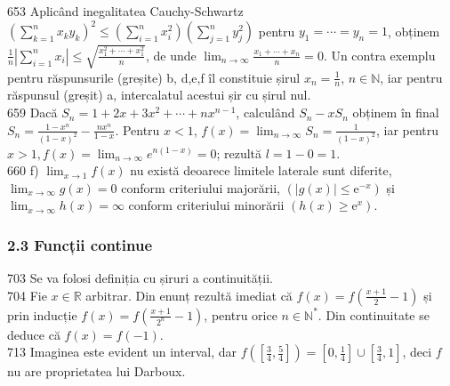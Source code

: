 \documentclass[11pt]{article}
\begin{document}
653 Aplicând inegalitatea Cauchy-Schwartz $\left(\sum_{k=1}^{n} x_{k} y_{k}\right)^{2} \leq\left(\sum_{i=1}^{n} x_{i}^{2}\right)\left(\sum_{j=1}^{n} y_{j}^{2}\right)$ pentru $y_{1}=\cdots=y_{n}=1$, obținem $\frac{1}{n}\left|\sum_{i=1}^{n} x_{i}\right| \leq \sqrt{\frac{x_{1}^{2}+\cdots+x_{1}^{2}}{n}}$, de unde $\lim _{n \rightarrow \infty} \frac{x_{1}+\cdots+x_{n}}{n}=0$. Un contra exemplu pentru răspunsurile (greșite) b, d,e,f îl constituie șirul $x_{n}=\frac{1}{n}$, $n \in \mathbb{N}$, iar pentru răspunsul (greșit) a, intercalatul acestui șir cu șirul nul.\\
659 Dacă $S_{n}=1+2 x+3 x^{2}+\cdots+n x^{n-1}$, calculând $S_{n}-x S_{n}$ obținem în final $S_{n}=\frac{1-x^{n}}{(1-x)^{2}}-\frac{n x^{n}}{1-x}$. Pentru $x<1$, $f(x)=\lim _{n \rightarrow \infty} S_{n}=\frac{1}{(1-x)^{2}}$, iar pentru $x>1, f(x)=\lim _{n \rightarrow \infty} e^{n(1-x)}=0$; rezultă $l=1-0=1$.\\
660 f) $\lim _{x \rightarrow 1} f(x)$ nu există deoarece limitele laterale sunt diferite, $\lim _{x \rightarrow \infty} g(x)=0$ conform criteriului majorării, $\left(|g(x)| \leq \mathrm{e}^{-x}\right)$ și $\lim _{x \rightarrow \infty} h(x)=\infty$ conform criteriului minorării $\left(h(x) \geq \mathrm{e}^{x}\right)$.\\

\subsubsection*{2.3 Funcții continue}
703 Se va folosi definiția cu șiruri a continuității.\\
704 Fie $x \in \mathbb{R}$ arbitrar. Din enunț rezultă imediat că $f(x)=f\left(\frac{x+1}{2}-1\right)$ și prin inducție $f(x)=f\left(\frac{x+1}{2^{n}}-1\right)$, pentru orice $n \in \mathbb{N}^{*}$. Din continuitate se deduce că $f(x)=f(-1)$.\\
713 Imaginea este evident un interval, dar $f\left(\left[\frac{3}{4}, \frac{5}{4}\right]\right)=\left[0, \frac{1}{4}\right] \cup\left[\frac{3}{4}, 1\right]$, deci $f$ nu are proprietatea lui Darboux.\\
\end{document}
